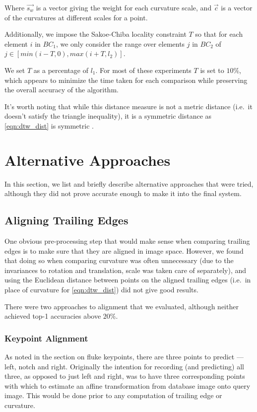 Where $\vec{s_w}$ is a vector giving the weight for each curvature scale, and $\vec{c}$ is a vector of the curvatures at different scales for a point.

Additionally, we impose the Sakoe-Chiba \cite{sakoe1978dynamic} locality constraint $T$ so that for each element $i$ in $BC_1$, we only consider the range over elements $j$ in $BC_2$ of $j \in [min(i - T, 0), max(i + T, l_2)]$.

We set $T$ as a percentage of $l_1$.
For most of these experiments $T$ is set to $10\%$, which appears to minimize the time taken for each comparison while preserving the overall accuracy of the algorithm.

It's worth noting that while this distance measure is not a metric distance (i.e.\ it doesn't satisfy the triangle inequality), it is a symmetric distance as \eqref{eqn:dtw_dist} is symmetric \cite{muller2007information}.

\section{Alternative Approaches}

In this section, we list and briefly describe alternative approaches that were tried, although they did not prove accurate enough to make it into the final system.

\subsection{Aligning Trailing Edges}

One obvious pre-processing step that would make sense when comparing trailing edges is to make sure that they are aligned in image space.
However, we found that doing so when comparing curvature was often unnecessary (due to the invariances to rotation and translation, scale was taken care of separately), and using the Euclidean distance between points on the aligned trailing edges (i.e.\ in place of curvature for \eqref{eqn:dtw_dist}) did not give good results.

There were two approaches to alignment that we evaluated, although neither achieved top-1 accuracies above $20\%$.

\subsubsection{Keypoint Alignment}

As noted in the section on fluke keypoints, there are three points to predict --- left, notch and right.
Originally the intention for recording (and predicting) all three, as opposed to just left and right, was to have three corresponding points with which to estimate an affine transformation from database image onto query image.
This would be done prior to any computation of trailing edge or curvature.

